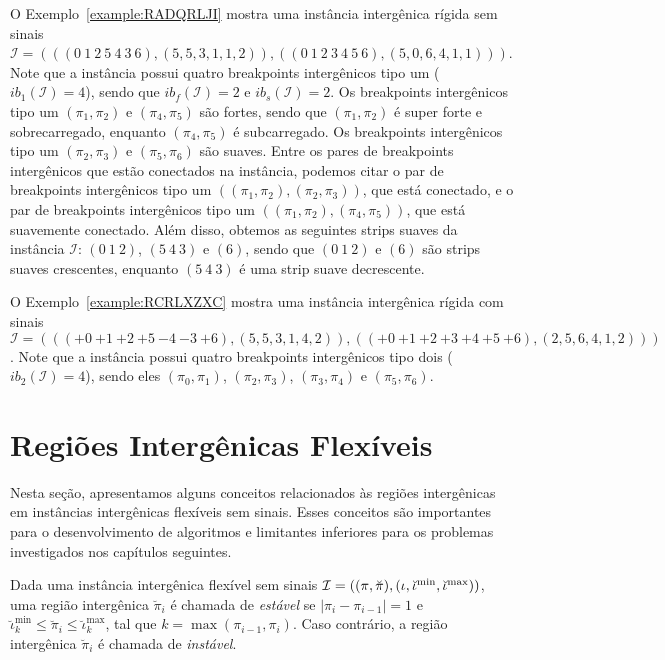 O Exemplo~\ref{example:RADQRLJI} mostra uma instância intergênica rígida sem sinais $\mathcal{I} = (((0~1~2~5~4~3\allowbreak~6),\allowbreak(5,5,3,1,1,2)),\allowbreak((0~1~2~3~4~5~6),\allowbreak(5,0,6,4,1,1)))$. Note que a instância possui quatro breakpoints intergênicos tipo um ($ib_{1}(\mathcal{I}) = 4$), sendo que $ib_f(\mathcal{I}) = 2$ e $ib_s(\mathcal{I}) = 2$. Os breakpoints intergênicos tipo um $(\pi_1,\pi_2)$ e $(\pi_4,\pi_5)$ são fortes, sendo que $(\pi_1,\pi_2)$ é super forte e sobrecarregado, enquanto $(\pi_4,\pi_5)$ é subcarregado. Os breakpoints intergênicos tipo um $(\pi_2,\pi_3)$ e $(\pi_5,\pi_6)$ são suaves. Entre os pares de breakpoints intergênicos que estão conectados na instância, podemos citar o par de breakpoints intergênicos tipo um $((\pi_1,\pi_2),(\pi_2,\pi_3))$, que está conectado, e o par de breakpoints intergênicos tipo um $((\pi_1,\pi_2),(\pi_4,\pi_5))$, que está suavemente conectado. Além disso, obtemos as seguintes strips suaves da instância $\mathcal{I}$: $(0~1~2)$, $(5~4~3)$ e $(6)$, sendo que $(0~1~2)$ e $(6)$ são strips suaves crescentes, enquanto $(5~4~3)$ é uma strip suave decrescente.



O Exemplo~\ref{example:RCRLXZXC} mostra uma instância intergênica rígida com sinais $\mathcal{I} = \allowbreak((({+0}~{+1}~{+2}~\allowbreak{+5}~{-4}~{-3}~{+6}),\allowbreak(5,5,3,1,4,2)),\allowbreak(({+0}~{+1}~{+2}~{+3}~{+4}~{+5}~{+6}),\allowbreak(2,5,6,4,1,2)))$. Note que a instância possui quatro breakpoints intergênicos tipo dois ($ib_{2}(\mathcal{I}) = 4$), sendo eles $(\pi_0,\pi_1)$, $(\pi_2,\pi_3)$, $(\pi_3,\pi_4)$ e $(\pi_5,\pi_6)$.



\section{Regiões Intergênicas Flexíveis}\label{section:JISAQWNF}

Nesta seção, apresentamos alguns conceitos relacionados às regiões intergênicas em instâncias intergênicas flexíveis sem sinais. Esses conceitos são importantes para o desenvolvimento de algoritmos e limitantes inferiores para os problemas investigados nos capítulos seguintes.

\begin{definition}
  Dada uma instância intergênica flexível sem sinais $\mathcal{I} = ((\pi,\breve\pi),\break(\iota,\breve\iota^{\min},\breve\iota^{\max}))$, uma região intergênica $\breve\pi_i$ é chamada de \emph{estável} se $|\pi_{i} - \pi_{i - 1}| = 1$ e $\breve\iota^{\min}_k \le \breve\pi_i \le \breve\iota^{\max}_k$, tal que $k = \max(\pi_{i-1}, \pi_i)$. Caso contrário, a região intergênica $\breve\pi_i$ é chamada de \emph{instável}. 
\end{definition}

